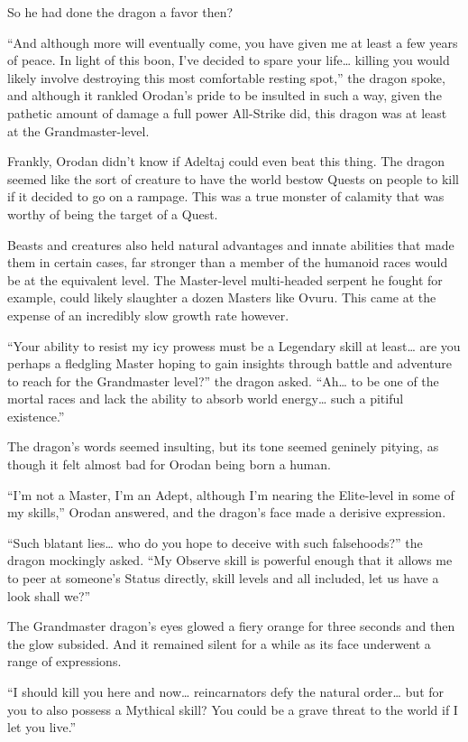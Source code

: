 \documentclass[a4paper,10pt]{book}
\begin{document}
So he had done the dragon a favor then?\par
“And although more will eventually come, you have given me at least a few years of peace. In light of this boon, I’ve decided to spare your life… killing you would likely involve destroying this most comfortable resting spot,” the dragon spoke, and although it rankled Orodan’s pride to be insulted in such a way, given the pathetic amount of damage a full power All-Strike did, this dragon was at least at the Grandmaster-level.\par
Frankly, Orodan didn’t know if Adeltaj could even beat this thing. The dragon seemed like the sort of creature to have the world bestow Quests on people to kill if it decided to go on a rampage. This was a true monster of calamity that was worthy of being the target of a Quest.\par
Beasts and creatures also held natural advantages and innate abilities that made them in certain cases, far stronger than a member of the humanoid races would be at the equivalent level. The Master-level multi-headed serpent he fought for example, could likely slaughter a dozen Masters like Ovuru. This came at the expense of an incredibly slow growth rate however.\par
“Your ability to resist my icy prowess must be a Legendary skill at least… are you perhaps a fledgling Master hoping to gain insights through battle and adventure to reach for the Grandmaster level?” the dragon asked. “Ah… to be one of the mortal races and lack the ability to absorb world energy… such a pitiful existence.”\par
The dragon’s words seemed insulting, but its tone seemed geninely pitying, as though it felt almost bad for Orodan being born a human.\par
“I’m not a Master, I’m an Adept, although I’m nearing the Elite-level in some of my skills,” Orodan answered, and the dragon’s face made a derisive expression.\par
“Such blatant lies… who do you hope to deceive with such falsehoods?” the dragon mockingly asked. “My Observe skill is powerful enough that it allows me to peer at someone’s Status directly, skill levels and all included, let us have a look shall we?”\par
The Grandmaster dragon’s eyes glowed a fiery orange for three seconds and then the glow subsided. And it remained silent for a while as its face underwent a range of expressions.\par
“I should kill you here and now… reincarnators defy the natural order… but for you to also possess a Mythical skill? You could be a grave threat to the world if I let you live.”\par
\end{document}
